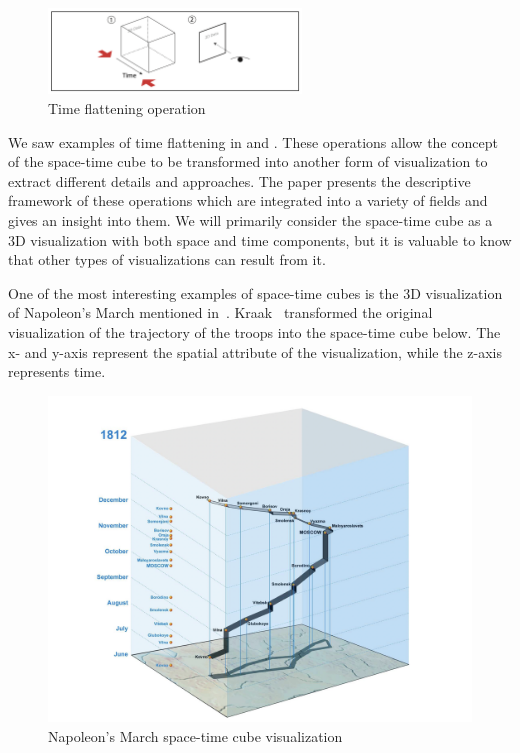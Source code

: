 \begin{figure}[hbt!]
    \begin{center}
        \includegraphics[width=0.6\textwidth]{graphics/2-literature-review/10}
    \end{center}
    \caption{Time flattening operation}
    \label{fig:figure2.9}
\end{figure}

We saw examples of time flattening in  and . These operations allow the
concept of the space-time cube to be transformed into another form of visualization to extract different details and approaches.
The paper presents the descriptive framework of these operations which are integrated into a variety of fields and gives an insight into them.
We will primarily consider the space-time cube as a 3D visualization with both space and time components, but it is valuable to know that other
types of visualizations can result from it.

One of the most interesting examples of space-time cubes is the 3D visualization of Napoleon’s March mentioned in~.
Kraak~\citep{kraak2003geovisualization} transformed the original visualization of the trajectory of the
troops into the space-time cube below. The x- and y-axis represent the spatial attribute of the visualization,
while the z-axis represents time.

\begin{figure}[hbt!]
    \begin{center}
        \includegraphics[width=\textwidth]{graphics/2-literature-review/8}
    \end{center}
    \caption{Napoleon's March space-time cube visualization}
    \label{fig:figure2.10}
\end{figure}

